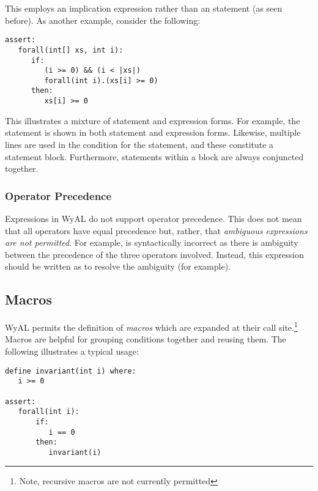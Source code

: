 This employs an implication expression rather than an 
statement (as seen before).  As another example, consider the
following:

\begin{tcolorbox}\begin{lstlisting}[language=WyAL]
assert:
   forall(int[] xs, int i):
      if:
         (i >= 0) && (i < |xs|)
         forall(int i).(xs[i] >= 0)
      then:
         xs[i] >= 0
\end{lstlisting}\end{tcolorbox}

This illustrates a mixture of statement and expression forms.  For
example, the  statement is shown in both statement
and expression forms.  Likewise, multiple lines are used in the
condition for the  statement, and these constitute a
statement block.  Furthermore, statements within a block are always
conjuncted together.

\subsubsection{Operator Precedence}

Expressions in WyAL do not support operator precedence.  This does not
mean that all operators have equal precedence but, rather, that {\em
  ambiguous expressions are not permitted}.  For example,
 is syntactically incorrect as there is
ambiguity between the precedence of the three operators involved.
Instead, this expression should be written as  to resolve the ambiguity (for example).

\subsection{Macros}

WyAL permits the definition of {\em macros} which are expanded at
their call site.\footnote{Note, recursive macros are not currently
  permitted}  Macros are helpful for grouping conditions together and
reusing them.  The following illustrates a typical usage:

\begin{tcolorbox}\begin{lstlisting}[language=WyAL]
define invariant(int i) where:
   i >= 0

assert:
   forall(int i):
       if:
          i == 0
       then:
          invariant(i)
\end{lstlisting}\end{tcolorbox}

